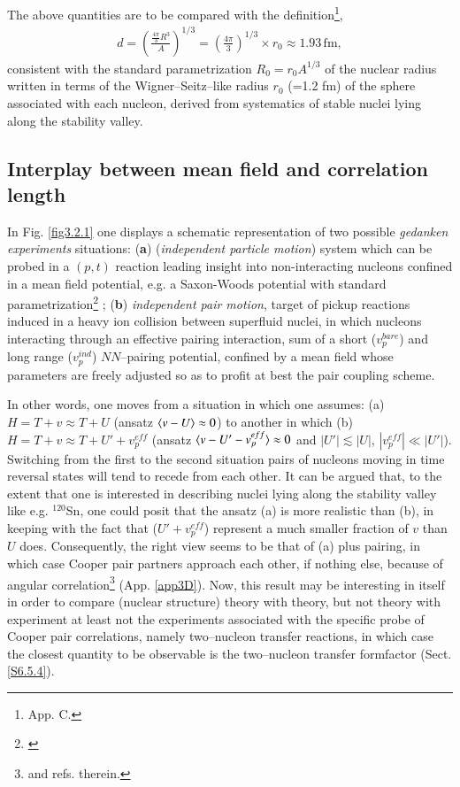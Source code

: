 The above quantities are to be compared with the definition\footnote{\cite{Brink:05} App. C.},
\begin{align}\label{eq3.2.27}
d=\left(\frac{\frac{4\pi}{3}R^3}{A}\right)^{1/3}=\left(\frac{4\pi}{3}\right)^{1/3}\times r_0\approx 1.93\, \text{fm},
\end{align} 
consistent with the standard parametrization $R_0=r_0A^{1/3}$ of the nuclear radius written in terms of the Wigner--Seitz--like radius $r_0$ (=1.2 fm) of the sphere associated with each nucleon, derived from systematics of stable nuclei lying along the stability valley.
\subsection{Interplay between mean field and correlation length}
In Fig. \ref{fig3.2.1} one displays a schematic representation of two possible \textit{gedanken experiments} situations: (\textbf{a}) (\textit{independent particle motion}) system which can be probed in a $(p,t)$ reaction leading insight into  non-interacting nucleons confined in a mean field potential, e.g. a Saxon-Woods potential with standard parametrization\footnote{\cite{Bohr:69}} ; (\textbf{b}) \textit{independent pair motion}, target of pickup reactions induced in a heavy ion collision between superfluid nuclei, in which nucleons interacting through an effective pairing interaction, sum of a short ($v_p^{bare}$) and long range ($v_p^{ind}$) $NN$--pairing potential, confined by a mean field whose parameters are freely adjusted so as to profit at best the pair coupling scheme.


In other words, one moves from a situation in which one assumes: (a)$H=T+v\approx T+U$ (ansatz $\langle {v-U} \rangle\approx 0$) to another in which (b) $H=T+v\approx T+U'+v_p^{eff}$ (ansatz $\langle {v-U'-v_p^{eff}} \rangle\approx 0$ and $|U'|\lesssim|U|$, $|v_p^{eff}|\ll|U'|$). Switching from the first to the second situation pairs of nucleons moving in time reversal states will tend to recede from each other. It can be argued that, to the extent that one is interested in describing  nuclei lying along the stability valley like e.g. $^{120}$Sn, one could  posit that the ansatz (a) is more realistic  than (b), in keeping with the fact that ($U'+v_p^{eff}$) represent a much smaller fraction of $v$ than $U$ does. Consequently, the right view seems to be that of (a) plus pairing, in which case Cooper pair partners approach each other, if nothing else, because of angular correlation\footnote{\cite{Bertsch:67,Ferreira:84,Matsuo:13} and refs. therein.} (App. \ref{app3D}). Now, this result may be interesting in itself in order  to compare (nuclear structure) theory with theory, but not theory with experiment at least not the experiments associated with the specific probe of Cooper pair correlations, namely two--nucleon transfer reactions, in which case the closest quantity to be observable is the two--nucleon transfer formfactor (Sect. \ref{S6.5.4}).


